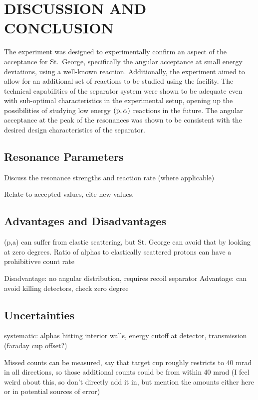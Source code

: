 \chapter{DISCUSSION AND CONCLUSION}
\label{ch:discussion-and-conclusion}

The experiment was designed to experimentally confirm an aspect of the
acceptance for St.\ George, specifically the angular acceptance at small
energy deviations, using a well-known reaction. Additionally, the
experiment aimed to allow for an additional set of reactions to be
studied using the facility. The technical capabilities of the separator
system were shown to be adequate even with sub-optimal characteristics
in the experimental setup, opening up the possibilities of studying low
energy $({\rm p},\alpha)$ reactions in the future. The angular acceptance at
the peak of the resonances was shown to be consistent with the desired design
characteristics of the separator.


\section{Resonance Parameters}
Discuss the resonance strengths and reaction rate (where applicable)

Relate to accepted values, cite new values.


\section{Advantages and Disadvantages}
(p,a) can suffer from elastic scattering, but St. George can avoid that by
looking at zero degrees. Ratio of alphas to elastically scattered protons
can have a prohibitivve count rate

Disadvantage: no angular distribution, requires recoil separator
Advantage: can avoid killing detectors, check zero degree


\section{Uncertainties}
\label{sec:uncertainties}


systematic: alphas hitting interior walls, energy cutoff at detector,
transmission (faraday cup offset?)

Missed counts can be measured, say that target cup roughly restricts to 40 mrad
in all directions, so those additional counts could be from within 40 mrad (I
feel weird about this, so don't directly add it in, but mention the amounts
either here or in potential sources of error)

